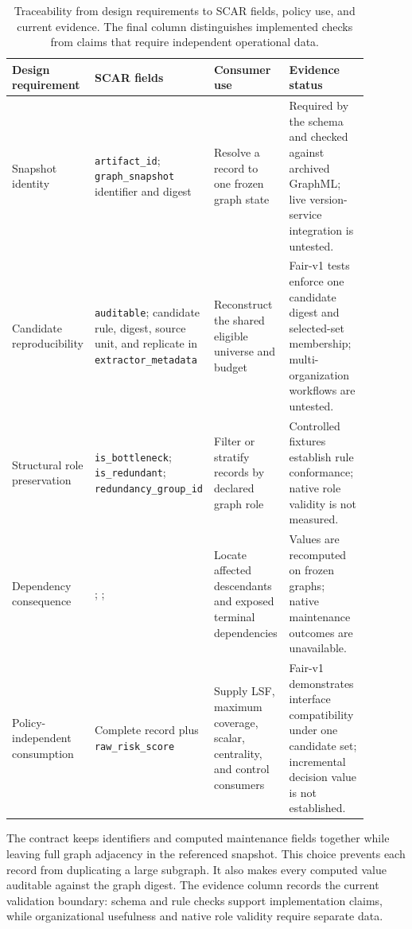 \documentclass[pdflatex,sn-basic]{sn-jnl}
\begin{document}
\begin{table}[!ht]
\caption{Traceability from design requirements to SCAR fields, policy use, and current evidence. The final column distinguishes implemented checks from claims that require independent operational data.}
\label{tab:design-requirement-traceability}
\centering
\scriptsize
\setlength{\tabcolsep}{2.5pt}
\renewcommand{\arraystretch}{1.12}
\begin{tabular}{@{}Z{0.16\linewidth}Z{0.23\linewidth}Z{0.22\linewidth}Z{0.28\linewidth}@{}}
\toprule
\textbf{Design requirement} & \textbf{SCAR fields} & \textbf{Consumer use} & \textbf{Evidence status} \\
\midrule
Snapshot identity & \texttt{artifact\_id}; \texttt{graph\_snapshot} identifier and digest & Resolve a record to one frozen graph state & Required by the schema and checked against archived GraphML; live version-service integration is untested. \\
Candidate reproducibility & \texttt{auditable}; candidate rule, digest, source unit, and replicate in \texttt{extractor\_metadata} & Reconstruct the shared eligible universe and budget & Fair-v1 tests enforce one candidate digest and selected-set membership; multi-organization workflows are untested. \\
Structural role preservation & \texttt{is\_bottleneck}; \texttt{is\_redundant}; \texttt{redundancy\_group\_id} & Filter or stratify records by declared graph role & Controlled fixtures establish rule conformance; native role validity is not measured. \\
Dependency consequence & ; ;  & Locate affected descendants and exposed terminal dependencies & Values are recomputed on frozen graphs; native maintenance outcomes are unavailable. \\
Policy-independent consumption & Complete record plus \texttt{raw\_risk\_score} & Supply LSF, maximum coverage, scalar, centrality, and control consumers & Fair-v1 demonstrates interface compatibility under one candidate set; incremental decision value is not established. \\
\bottomrule
\end{tabular}
\end{table}
\FloatBarrier

The contract keeps identifiers and computed maintenance fields together while leaving full graph adjacency in the referenced snapshot. This choice prevents each record from duplicating a large subgraph. It also makes every computed value auditable against the graph digest. The evidence column records the current validation boundary: schema and rule checks support implementation claims, while organizational usefulness and native role validity require separate data.
\end{document}
